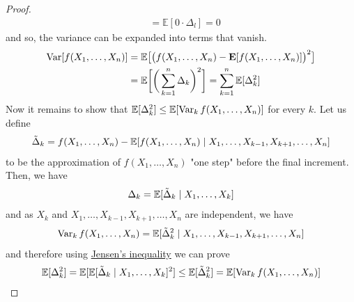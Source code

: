 \begin{proof}
\begin{align*}
      & = \mathbb{E}[0 \cdot \Delta_l] = 0
  \end{align*}
  and so, the variance can be expanded into terms that vanish. 
  \begin{align*}
      \operatorname{Var}[ f(X_1, \ldots, X_n)] & = \mathbb{E} \big[ \big( f( X_1, \ldots, X_n) - \mathbf{E}[ f(X_1, \ldots, X_n)] \big)^2\big] \\
      & = \mathbb{E} \bigg[ \bigg( \sum_{k=1}^n \Delta_k \bigg)^2 \bigg] = \sum_{k=1}^n \mathbb{E}[ \Delta_k^2]
  \end{align*}
  Now it remains to show that $\mathbb{E}[\Delta_k^2] \leq \mathbb{E}[\operatorname{Var}_k f(X_1, \ldots, X_n)]$ for every $k$. Let us define 
  \begin{equation}
    \Tilde{\Delta}_k = f(X_1, \ldots, X_n) - \mathbb{E}[f(X_1, \ldots, X_n) \mid X_1, \ldots, X_{k-1}, X_{k+1}, \ldots, X_n]
  \end{equation}
  to be the approximation of $f(X_1, \ldots, X_n)$ "one step" before the final increment. Then, we have 
  \begin{equation}
    \Delta_k = \mathbb{E}[\Tilde{\Delta}_k \mid X_1, \ldots, X_k]
  \end{equation}
  and as $X_k$ and $X_1, \ldots, X_{k-1}, X_{k+1}, \ldots, X_n$ are independent, we have 
  \begin{equation}
    \operatorname{Var}_k f(X_1, \ldots, X_n) = \mathbb{E}[\Tilde{\Delta}_k^2 \mid X_1, \ldots, X_{k-1}, X_{k+1}, \ldots, X_n]
  \end{equation}
  and therefore using \hyperref[thm:jensens-inequality]{Jensen's inequality} we can prove 
  \begin{equation}
    \mathbb{E}[\Delta_k^2] = \mathbb{E}[\mathbb{E}[ \Tilde{\Delta}_k \mid X_1, \ldots, X_k]^2 ] \leq \mathbb{E}[\Tilde{\Delta}_k^2] = \mathbb{E}[\operatorname{Var}_k f(X_1, \ldots, X_n)]
  \end{equation}
  \end{proof}

